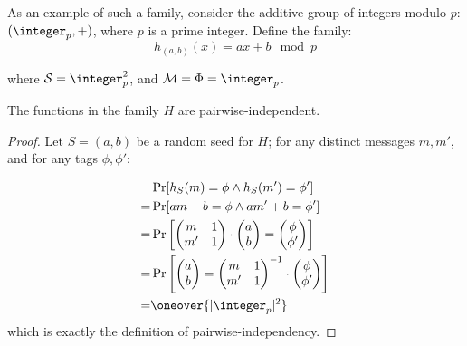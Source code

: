 
As an example of such a family, consider the additive group of integers modulo $p$: $(\integer_p, +)$, where $p$ is a prime integer. Define the family:
\[
    h_{(a, b)}(x) = ax + b \mod p
\]

where $\mathcal{S} = \integer_p^2$, and $\M = \Phi = \integer_p$. 

\begin{theorem}
    The functions in the family $H$ are pairwise-independent.
\end{theorem}

\begin{proof}
    Let $S = (a, b)$ be a random seed for $H$; for any distinct messages $m, m'$, and for any tags $\phi, \phi'$:

    \begin{align*}
        & \Pr[h_S(m) = \phi \wedge h_S(m') = \phi'] \\
        =& \Pr[am + b = \phi \wedge am' + b = \phi'] \\
        =& \Pr\left[
        \begin{pmatrix}
            m & 1 \\
            m' & 1
        \end{pmatrix}
        \cdot
        \begin{pmatrix}
            a \\
            b
        \end{pmatrix}
        =
        \begin{pmatrix}
            \phi \\
            \phi'
        \end{pmatrix}
        \right] \\
        =& \Pr\left[
        \begin{pmatrix}
            a \\
            b
        \end{pmatrix}
        =
        \begin{pmatrix}
            m & 1 \\
            m' & 1
        \end{pmatrix}^{-1}
        \cdot
        \begin{pmatrix}
            \phi \\
            \phi'
        \end{pmatrix}
        \right] \\
        =& \oneover{|\integer_p|^2}
    \end{align*}
    which is exactly the definition of pairwise-independency.
\end{proof}

